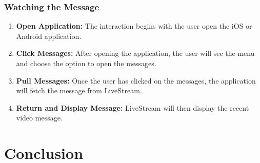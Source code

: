 \documentclass[letterpaper,10pt,draftclsnofoot,onecolumn,titlepage]{IEEEtran}
\begin{document}
			\subsubsection{Watching the Message}
				\begin{enumerate}
					\item \textbf{Open Application:} The interaction begins with the user open the iOS or Android application. 
					\item \textbf{Click Messages:} After opening the application, the user will see the menu and choose the option to open the messages. 
					\item \textbf{Pull Messages:} Once the user has clicked on the messages, the application will fetch the message from LiveStream.
					\item \textbf{Return and Display Message:} LiveStream will then display the recent video message. 
				\end{enumerate}




	\section{Conclusion}
\end{document}
